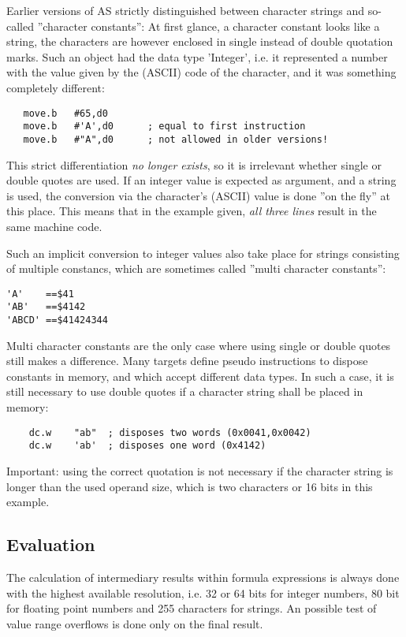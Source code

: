 \documentclass[12pt,twoside]{report}
\newcommand{\asname}{{AS}}
\begin{document}
Earlier versions of \asname{} strictly distinguished between character
strings and so-called ''character constants'': At first glance, a
character constant looks like a string, the characters are however
enclosed in single instead of double quotation marks.  Such an object had
the data type 'Integer', i.e. it represented a number with the value
given by the (ASCII) code of the character, and it was something
completely different:

\begin{verbatim}
   move.b   #65,d0
   move.b   #'A',d0      ; equal to first instruction
   move.b   #"A",d0      ; not allowed in older versions!
\end{verbatim}

This strict differentiation {\em no longer exists}, so it is irrelevant
whether single or double quotes are used.  If an integer value
is expected as argument, and a string is used, the conversion via the
character's (ASCII) value is done ''on the fly'' at this place. This
means that in the example given, {\em all three lines} result in the
same machine code.

Such an implicit conversion to integer values also take place for strings
consisting of multiple constancs, which are sometimes called ''multi
character constants'':
\begin{verbatim}
'A'    ==$41
'AB'   ==$4142
'ABCD' ==$41424344
\end{verbatim}
Multi character constants are the only case where using single or double
quotes still makes a difference.  Many targets define pseudo instructions
to dispose constants in memory, and which accept different data types.
In such a case, it is still necessary to use double quotes if a character
string shall be placed in memory:
\begin{verbatim}
    dc.w    "ab"  ; disposes two words (0x0041,0x0042)
    dc.w    'ab'  ; disposes one word (0x4142)
\end{verbatim}
Important: using the correct quotation is not necessary if the character
string is longer than the used operand size, which is two characters or
16 bits in this example.

\subsection{Evaluation}

The calculation of intermediary results within formula expressions is
always done with the highest available resolution, i.e. 32 or 64 bits for
integer numbers, 80 bit for floating point numbers and 255 characters
for strings.  An possible test of value range overflows is done only
on the final result.
\end{document}
